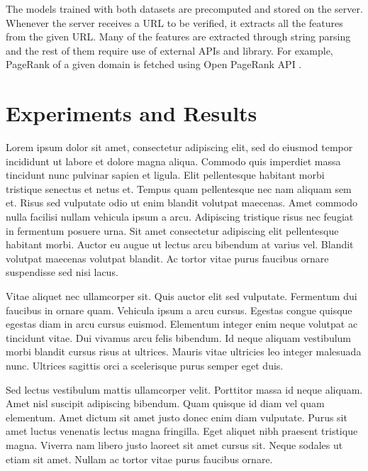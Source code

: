 \documentclass[conference]{IEEEtran}
\begin{document}
The models trained with both datasets are precomputed and stored on the server.
Whenever the server receives a URL to be verified, it extracts all the features from the given URL.
Many of the features are extracted through string parsing and the rest of them require use of external APIs and library.
For example, PageRank of a given domain is fetched using Open PageRank API \cite{OpenPageRank}.

\section{Experiments and Results}
Lorem ipsum dolor sit amet, consectetur adipiscing elit, sed do eiusmod tempor incididunt ut labore et dolore magna aliqua. Commodo quis imperdiet massa tincidunt nunc pulvinar sapien et ligula. Elit pellentesque habitant morbi tristique senectus et netus et. Tempus quam pellentesque nec nam aliquam sem et. Risus sed vulputate odio ut enim blandit volutpat maecenas. Amet commodo nulla facilisi nullam vehicula ipsum a arcu. Adipiscing tristique risus nec feugiat in fermentum posuere urna. Sit amet consectetur adipiscing elit pellentesque habitant morbi. Auctor eu augue ut lectus arcu bibendum at varius vel. Blandit volutpat maecenas volutpat blandit. Ac tortor vitae purus faucibus ornare suspendisse sed nisi lacus.

Vitae aliquet nec ullamcorper sit. Quis auctor elit sed vulputate. Fermentum dui faucibus in ornare quam. Vehicula ipsum a arcu cursus. Egestas congue quisque egestas diam in arcu cursus euismod. Elementum integer enim neque volutpat ac tincidunt vitae. Dui vivamus arcu felis bibendum. Id neque aliquam vestibulum morbi blandit cursus risus at ultrices. Mauris vitae ultricies leo integer malesuada nunc. Ultrices sagittis orci a scelerisque purus semper eget duis.

Sed lectus vestibulum mattis ullamcorper velit. Porttitor massa id neque aliquam. Amet nisl suscipit adipiscing bibendum. Quam quisque id diam vel quam elementum. Amet dictum sit amet justo donec enim diam vulputate. Purus sit amet luctus venenatis lectus magna fringilla. Eget aliquet nibh praesent tristique magna. Viverra nam libero justo laoreet sit amet cursus sit. Neque sodales ut etiam sit amet. Nullam ac tortor vitae purus faucibus ornare.
\end{document}
